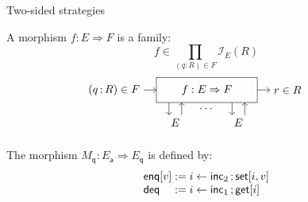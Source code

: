 \documentclass[aspectratio=141]{beamer}
\newcommand{\kw}[1]{\ensuremath{ \mathsf{#1} }}
\begin{document}
\begin{frame}{Two-sided strategies} %
  \begin{definition}
    A morphism $f : E \Rightarrow F$ is a family:
    \[
      f \in \prod_{(q : R) \in F} \mathcal{I}_E(R)
    \]
    \[
      \begin{tikzpicture}[scale=0.4]
        \draw[->] (-5,0) node[left] {$(q \mathop{:} R) \in F$} -- (-4,0);
        \draw (-4,-1) rectangle (4,1);
        \draw[->] (4,0) -- (5,0) node[right] {$r \in R$};
        \node (f) at (0,0) {$f : E \Rightarrow F$};
        \draw[->] (-3, -1) -- (-3, -2);
        \draw[->] (-2, -2) -- (-2, -1);
        \node[below] at (0, -1) {$\cdots$};
        \draw[->] (2, -1) -- (2, -2);
        \draw[->] (3, -2) -- (3, -1);
        \node[below] at (-2.5, -2) {$E$};
        \node[below] at ( 2.5, -2) {$E$};
      \end{tikzpicture}
      \qquad
    \]
  \end{definition}
  \pause
  \begin{example}
    The morphism $M_\kw{q} : E_\kw{a} \Rightarrow E_\kw{q}$ is defined by:
    \[
      \begin{array}{l@{}l}
        \kw{enq}[v] & {} :=
          i \leftarrow \kw{inc}_2 \mathop{;} \kw{set}[i, v] \\
        \kw{deq} & {} :=
          i \leftarrow \kw{inc}_1 \mathop{;} \kw{get}[i]
      \end{array}
    \]
  \end{example}
\end{frame}
\end{document}
